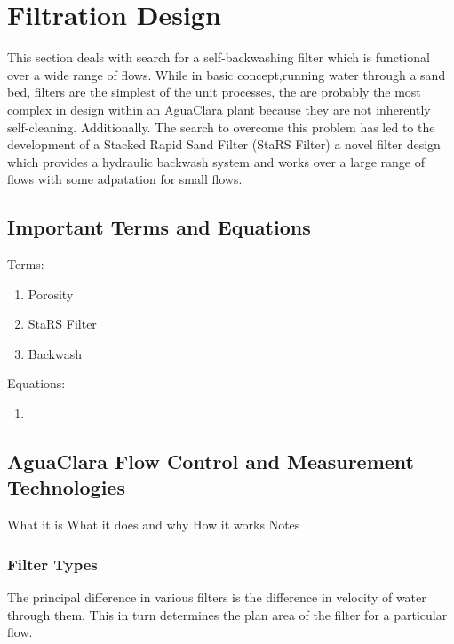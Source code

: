 \documentclass[letterpaper,10pt,english]{sphinxmanual}
\begin{document}
{\chapter{Filtration Design}
\label{\detokenize{Filtration/Filtration_Design:filtration-design}}\label{\detokenize{Filtration/Filtration_Design:title-filtration}}\label{\detokenize{Filtration/Filtration_Design::doc}}
This section deals with search for a self-backwashing filter which is functional over a wide range of flows. While in basic concept,running water through a sand bed, filters are the simplest of the unit processes, the are probably the most complex in design within an AguaClara plant because they are not inherently self-cleaning. Additionally. The search to overcome this problem has led to the development of a Stacked Rapid Sand Filter (StaRS Filter) a novel filter design which provides a hydraulic backwash system and works over a large range of flows with some adpatation for small flows.


\section{Important Terms and Equations}
\label{\detokenize{Filtration/Filtration_Design:important-terms-and-equations}}\label{\detokenize{Filtration/Filtration_Design:heading-filtration-terms}}
Terms:
\begin{enumerate}
\item {} 
Porosity

\item {} 
StaRS Filter

\item {} 
Backwash

\end{enumerate}

Equations:
\begin{enumerate}
\item {} 
\end{enumerate}


\section{AguaClara Flow Control and Measurement Technologies}
\label{\detokenize{Filtration/Filtration_Design:aguaclara-flow-control-and-measurement-technologies}}\label{\detokenize{Filtration/Filtration_Design:heading-aguaclara-filtration-technologies}}
What it is
What it does and why
How it works
Notes


\subsection{Filter Types}
\label{\detokenize{Filtration/Filtration_Design:filter-types}}\label{\detokenize{Filtration/Filtration_Design:heading-filter-types}}
The principal difference in various filters is the difference in velocity of water through them. This in turn determines the plan area of the filter for a particular flow.

}
\end{document}

